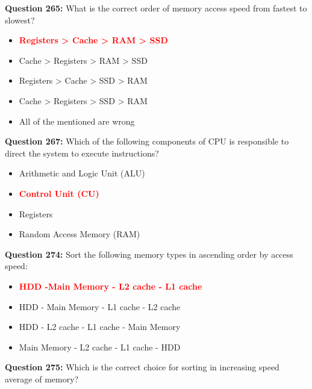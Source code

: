 \documentclass[12pt,a4paper]{article}
\begin{document}
\vspace{0.5cm}

\textbf{Question 265:} What is the correct order of memory access speed from fastest to slowest?

\begin{itemize}
    \item[\textbf{A.}] \textcolor{red}{\textbf{Registers > Cache > RAM > SSD}}
    \item[\textbf{B.}] Cache > Registers > RAM > SSD
    \item[\textbf{C.}] Registers > Cache > SSD > RAM
    \item[\textbf{D.}] Cache > Registers > SSD > RAM
    \item[\textbf{E.}] All of the mentioned are wrong
\end{itemize}

\vspace{0.5cm}

\textbf{Question 267:} Which of the following components of CPU is responsible to direct the system to execute instructions?

\begin{itemize}
    \item[\textbf{A.}] Arithmetic and Logic Unit (ALU)
    \item[\textbf{B.}] \textcolor{red}{\textbf{Control Unit (CU)}}
    \item[\textbf{C.}] Registers
    \item[\textbf{D.}] Random Access Memory (RAM)
\end{itemize}

\vspace{0.5cm}

\textbf{Question 274:} Sort the following memory types in ascending order by access speed:

\begin{itemize}
    \item[\textbf{A.}] \textcolor{red}{\textbf{HDD -Main Memory - L2 cache - L1 cache}}
    \item[\textbf{B.}] HDD - Main Memory - L1 cache - L2 cache
    \item[\textbf{C.}] HDD - L2 cache - L1 cache - Main Memory
    \item[\textbf{D.}] Main Memory - L2 cache - L1 cache - HDD
\end{itemize}

\vspace{0.5cm}

\textbf{Question 275:} Which is the correct choice for sorting in increasing speed average of memory?
\end{document}
